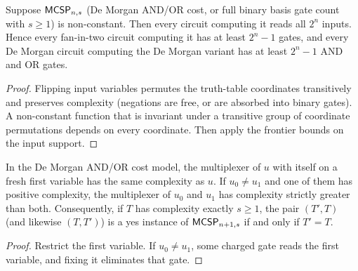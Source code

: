 \begin{theorem}
  \label{thm:lowerbounds-algebraic-mcsp-essential}
  \leanok
  Suppose $\mathsf{MCSP}_{n,s}$ (De Morgan AND/OR cost, or full binary basis
  gate count with $s \ge 1$) is non-constant. Then every circuit computing
  it reads all $2^n$ inputs. Hence every fan-in-two circuit computing it has
  at least $2^n - 1$ gates, and every De Morgan circuit computing the De Morgan
  variant has at least $2^n - 1$ AND and OR gates.
\end{theorem}
\begin{proof}
  \leanok
  Flipping input variables permutes the truth-table coordinates transitively
  and preserves complexity (negations are free, or are absorbed into binary
  gates). A non-constant function that is invariant under a transitive group
  of coordinate permutations depends on every coordinate. Then apply the
  frontier bounds on the input support.
\end{proof}

\begin{theorem}
  \label{thm:lowerbounds-algebraic-mcsp-subcube}
  \leanok
  In the De Morgan AND/OR cost model, the multiplexer of $u$ with itself on a
  fresh first variable has the same complexity as $u$. If $u_0 \ne u_1$ and
  one of them has positive complexity, the multiplexer of $u_0$ and $u_1$ has
  complexity strictly greater than both. Consequently, if $T$ has complexity
  exactly $s \ge 1$, the pair $(T', T)$ (and likewise $(T, T')$) is a yes
  instance of $\mathsf{MCSP}_{n+1,s}$ if and only if $T' = T$.
\end{theorem}
\begin{proof}
  \leanok
  Restrict the first variable. If $u_0 \ne u_1$, some charged gate reads the
  first variable, and fixing it eliminates that gate.
\end{proof}

